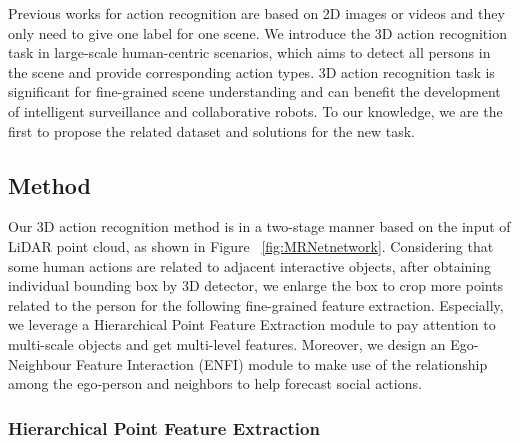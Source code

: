 
Previous works for action recognition are based on 2D images or videos and they only need to give one label for one scene. We introduce the 3D action recognition task in large-scale human-centric scenarios, which aims to detect all persons in the scene and provide corresponding action types. 3D action recognition task is significant for fine-grained scene understanding and can benefit the development of intelligent surveillance and collaborative robots. To our knowledge, we are the first to propose the related dataset and solutions for the new task. 


\subsection{Method}
Our 3D action recognition method is in a two-stage manner based on the input of LiDAR point cloud, as shown in Figure ~\ref{fig:MRNetnetwork}. Considering that some human actions are related to adjacent interactive objects, after obtaining individual bounding box by 3D detector, we enlarge the box to crop more points related to the person for the following fine-grained feature extraction. Especially, we leverage a Hierarchical Point Feature Extraction module to pay attention to multi-scale objects and get multi-level features. Moreover, we design an Ego-Neighbour Feature Interaction (ENFI) module to make use of the relationship among the ego-person and neighbors to help forecast social actions. 

\subsubsection{Hierarchical Point Feature Extraction}

